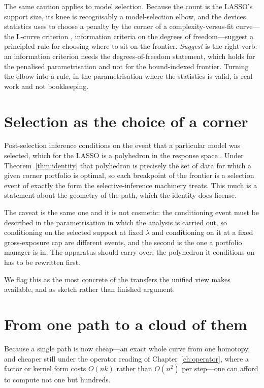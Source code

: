 The same caution applies to model selection. Because the count is the LASSO's support
size, its knee is recognisably a model-selection elbow, and the devices statistics
uses to choose a penalty by the corner of a complexity-versus-fit curve---the L-curve
criterion \cite{hansen1992}, information criteria on the degrees of freedom---suggest
a principled rule for choosing where to sit on the frontier. \emph{Suggest} is the
right verb: an information criterion needs the degrees-of-freedom statement, which
holds for the penalised parametrisation and not for the bound-indexed frontier.
Turning the elbow into a rule, in the parametrisation where the statistics is valid,
is real work and not bookkeeping.

\section{Selection as the choice of a corner}

Post-selection inference conditions on the event that a particular model was
selected, which for the LASSO is a polyhedron in the response space
\cite{lee2016,tibshirani2016psi}. Under Theorem~\ref{thm:identity} that polyhedron is
precisely the set of data for which a given corner portfolio is optimal, so each
breakpoint of the frontier is a selection event of exactly the form the
selective-inference machinery treats. This much is a statement about the geometry of
the path, which the identity does license.

The caveat is the same one and it is not cosmetic: the conditioning event must be
described in the parametrisation in which the analysis is carried out, so conditioning
on the selected support at fixed $\lambda$ and conditioning on it at a fixed
gross-exposure cap are different events, and the second is the one a portfolio manager
is in. The apparatus should carry over; the polyhedron it conditions on has to be
rewritten first.

We flag this as the most concrete of the transfers the unified view makes available,
and as sketch rather than finished argument.

\section{From one path to a cloud of them}

Because a single path is now cheap---an exact whole curve from one homotopy, and
cheaper still under the operator reading of Chapter~\ref{ch:operator}, where a factor
or kernel form costs $O(nk)$ rather than $O(n^2)$ per step---one can afford to compute
not one but hundreds.

